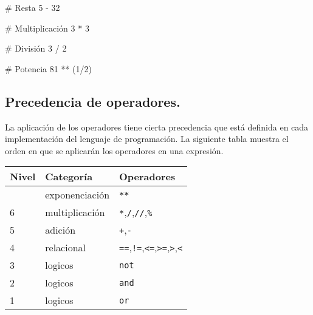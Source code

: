 \documentclass[
  letterpaper,
  DIV=11,
  numbers=noendperiod]{scrreprt}
\newenvironment{Shaded}{\begin{snugshade}}{\end{snugshade}}
\newcommand{\CommentTok}[1]{\textcolor[rgb]{0.37,0.37,0.37}{#1}}
\newcommand{\DecValTok}[1]{\textcolor[rgb]{0.68,0.00,0.00}{#1}}
\newcommand{\NormalTok}[1]{\textcolor[rgb]{0.00,0.23,0.31}{#1}}
\newcommand{\OperatorTok}[1]{\textcolor[rgb]{0.37,0.37,0.37}{#1}}
\begin{document}
\begin{Shaded}
\begin{Highlighting}[]
\CommentTok{\# Resta}
\DecValTok{5} \OperatorTok{{-}} \DecValTok{32}
\end{Highlighting}
\end{Shaded}

\begin{Shaded}
\begin{Highlighting}[]
\CommentTok{\# Multiplicación}
\DecValTok{3} \OperatorTok{*} \DecValTok{3}
\end{Highlighting}
\end{Shaded}

\begin{Shaded}
\begin{Highlighting}[]
\CommentTok{\# División}
\DecValTok{3} \OperatorTok{/} \DecValTok{2}
\end{Highlighting}
\end{Shaded}

\begin{Shaded}
\begin{Highlighting}[]
\CommentTok{\# Potencia}
\DecValTok{81} \OperatorTok{**}\NormalTok{ (}\DecValTok{1}\OperatorTok{/}\DecValTok{2}\NormalTok{)}
\end{Highlighting}
\end{Shaded}

\subsection{Precedencia de
operadores.}\label{precedencia-de-operadores.}

La aplicación de los operadores tiene cierta precedencia que está
definida en cada implementación del lenguaje de programación. La
siguiente tabla muestra el orden en que se aplicarán los operadores en
una expresión.

\begin{longtable}[]{@{}lll@{}}
\toprule\noalign{}
Nivel & Categoría & Operadores \\
\midrule\noalign{}
\endhead
\bottomrule\noalign{}
\endlastfoot
7 & exponenciación & \texttt{**} \\
6 & multiplicación & \texttt{*},\texttt{/},\texttt{//},\texttt{\%} \\
5 & adición & \texttt{+},\texttt{-} \\
4 & relacional &
\texttt{==},\texttt{!=},\texttt{\textless{}=},\texttt{\textgreater{}=},\texttt{\textgreater{}},\texttt{\textless{}} \\
3 & logicos & \texttt{not} \\
2 & logicos & \texttt{and} \\
1 & logicos & \texttt{or} \\
\end{longtable}
\end{document}
